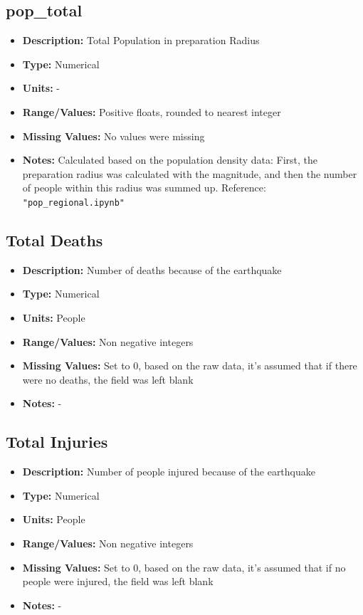 \documentclass{article}
\begin{document}
\subsection{pop\_total}
\begin{itemize}
    \item \textbf{Description:} Total Population in preparation Radius
    \item \textbf{Type:} Numerical
    \item \textbf{Units:} -
    \item \textbf{Range/Values:} Positive floats, rounded to nearest integer
    \item \textbf{Missing Values:} No values were missing
    \item \textbf{Notes:} Calculated based on the population density data: First, the preparation radius was calculated with the magnitude, and then the number of people within this radius was summed up. Reference: \lstinline{"pop_regional.ipynb"}
\end{itemize}

\subsection{Total Deaths}
\begin{itemize}
    \item \textbf{Description:} Number of deaths because of the earthquake
    \item \textbf{Type:} Numerical
    \item \textbf{Units:} People
    \item \textbf{Range/Values:} Non negative integers
    \item \textbf{Missing Values:} Set to 0, based on the raw data, it's assumed that if there were no deaths, the field was left blank
    \item \textbf{Notes:} -
\end{itemize}

\subsection{Total Injuries}
\begin{itemize}
    \item \textbf{Description:} Number of people injured because of the earthquake
    \item \textbf{Type:} Numerical
    \item \textbf{Units:} People
    \item \textbf{Range/Values:} Non negative integers
    \item \textbf{Missing Values:} Set to 0, based on the raw data, it's assumed that if no people were injured, the field was left blank
    \item \textbf{Notes:} -
\end{itemize}
\end{document}
